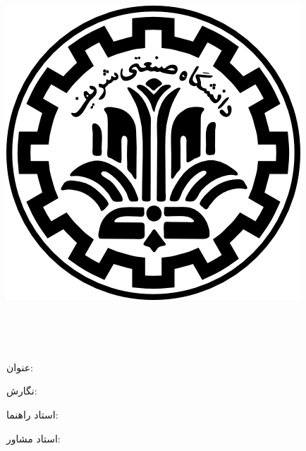 
\pagestyle{empty}

\begin{center}

\includegraphics[scale=0.2]{front/template/images/logo.png}

\begin{large}

\vspace{-0.2cm}
\ThesisUniversity \\[-0.3em]
\ThesisDepartment

\vspace{0.5cm}

\ThesisType \\[-0.3em]
\ThesisMajor

\end{large}

\vspace{1cm}

{عنوان:}\\[1.2em]
{\LARGE\textbf{\ThesisTitle}}

\vspace{1cm}

{نگارش:}\\[.5em]
{\large\textbf{\ThesisAuthor}}

\vspace{0.7cm}

{استاد راهنما:}\\[.5em]
{\large\textbf{\ThesisSupervisor}}

\vspace{0.3cm}

{استاد مشاور:}\\[.5em]
{\large\textbf{\ThesisAdvisor}}

\vspace{1.3cm}

\ThesisDate

\end{center}

\newpage
